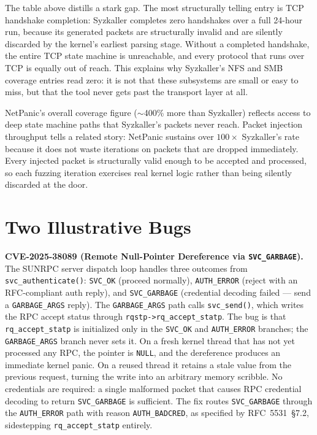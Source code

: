 \documentclass[10pt]{article}
\begin{document}
The table above distills a stark gap. The most structurally telling entry is TCP handshake completion: Syzkaller completes zero handshakes over a full 24-hour run, because its generated packets are structurally invalid and are silently discarded by the kernel's earliest parsing stage. Without a completed handshake, the entire TCP state machine is unreachable, and every protocol that runs over TCP is equally out of reach. This explains why Syzkaller's NFS and SMB coverage entries read zero: it is not that these subsystems are small or easy to miss, but that the tool never gets past the transport layer at all.

NetPanic's overall coverage figure ($\sim$400\% more than Syzkaller) reflects access to deep state machine paths that Syzkaller's packets never reach. Packet injection throughput tells a related story: NetPanic sustains over $100\times$ Syzkaller's rate because it does not waste iterations on packets that are dropped immediately. Every injected packet is structurally valid enough to be accepted and processed, so each fuzzing iteration exercises real kernel logic rather than being silently discarded at the door.

\section{Two Illustrative Bugs}

\textbf{CVE-2025-38089 (Remote Null-Pointer Dereference via \texttt{SVC\_GARBAGE}).}
The SUNRPC server dispatch loop handles three outcomes from \texttt{svc\_authenticate()}: \texttt{SVC\_OK} (proceed normally), \texttt{AUTH\_ERROR} (reject with an RFC-compliant auth reply), and \texttt{SVC\_GARBAGE} (credential decoding failed --- send a \texttt{GARBAGE\_ARGS} reply). The \texttt{GARBAGE\_ARGS} path calls \texttt{svc\_send()}, which writes the RPC accept status through \texttt{rqstp->rq\_accept\_statp}. The bug is that \texttt{rq\_accept\_statp} is initialized only in the \texttt{SVC\_OK} and \texttt{AUTH\_ERROR} branches; the \texttt{GARBAGE\_ARGS} branch never sets it. On a fresh kernel thread that has not yet processed any RPC, the pointer is \texttt{NULL}, and the dereference produces an immediate kernel panic. On a reused thread it retains a stale value from the previous request, turning the write into an arbitrary memory scribble. No credentials are required: a single malformed packet that causes RPC credential decoding to return \texttt{SVC\_GARBAGE} is sufficient. The fix routes \texttt{SVC\_GARBAGE} through the \texttt{AUTH\_ERROR} path with reason \texttt{AUTH\_BADCRED}, as specified by RFC~5531~\S7.2, sidestepping \texttt{rq\_accept\_statp} entirely.
\end{document}
